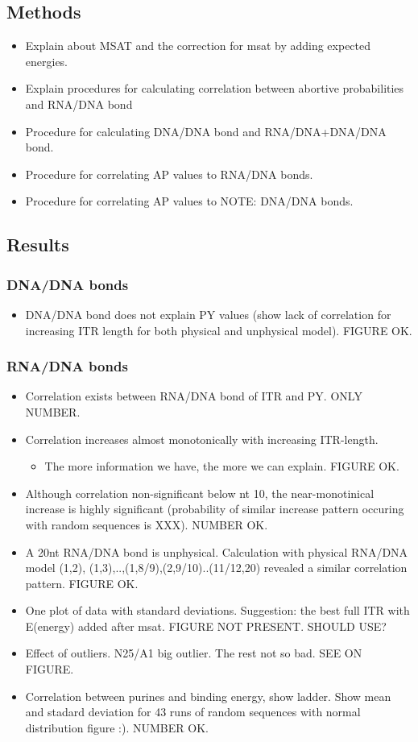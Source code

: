 \documentclass[a4paper]{article}
\begin{document}
 
\subsection{Methods}
\begin{itemize}
	\item Explain about MSAT and the correction for msat by adding expected
		energies.
	\item Explain procedures for calculating correlation between abortive
		probabilities and RNA/DNA bond
	\item Procedure for calculating DNA/DNA bond and RNA/DNA+DNA/DNA bond.
	\item Procedure for correlating AP values to RNA/DNA bonds.
	\item Procedure for correlating AP values to NOTE: DNA/DNA bonds.
\end{itemize}
\subsection{Results}
\subsubsection{DNA/DNA bonds}
\begin{itemize}
	\item DNA/DNA bond does not explain PY values (show lack of correlation for
		increasing ITR length for both physical and unphysical model). FIGURE
		OK.
\end{itemize}
\subsubsection{RNA/DNA bonds}
\begin{itemize}
	\item Correlation exists between RNA/DNA bond of ITR and PY. ONLY NUMBER.
	\item Correlation increases almost monotonically with increasing ITR-length.
		\begin{itemize}
			\item The more information we have, the more we can explain. FIGURE
				OK.
		\end{itemize}
	\item Although correlation non-significant below nt 10, the near-monotinical
		increase is highly significant (probability of similar increase pattern
		occuring with random sequences is XXX). NUMBER OK.
	\item A 20nt RNA/DNA bond is unphysical. Calculation with physical RNA/DNA
		model (1,2), (1,3),..,(1,8/9),(2,9/10)..(11/12,20) revealed a similar
		correlation pattern. FIGURE OK.
	\item One plot of data with standard deviations. Suggestion: the best full
		ITR with E(energy) added after msat. FIGURE NOT PRESENT. SHOULD USE?
	\item Effect of outliers. N25/A1 big outlier. The rest not so bad. SEE ON
		FIGURE.	
	\item Correlation between purines and binding energy, show ladder. Show mean
		and stadard deviation for 43 runs of random sequences with normal
		distribution figure :). NUMBER OK.
\end{itemize}
\end{document}
